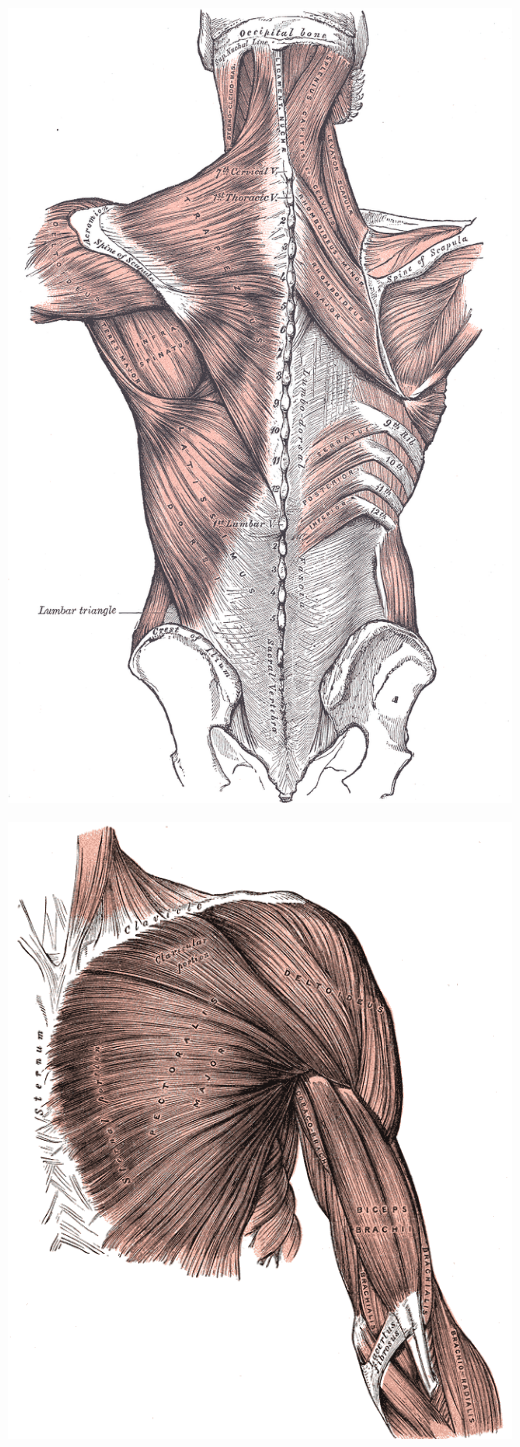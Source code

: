 \documentclass[pdftex,a4paper,11pt]{report}
\numberwithin{equation}{subsection}
\begin{document}
\begin{center}
        \includegraphics[width=.80\linewidth]{fig/Gray409}
\end{center}

\begin{center}
        \includegraphics[width=.80\linewidth]{fig/Gray410}
\end{center}
\end{document}
